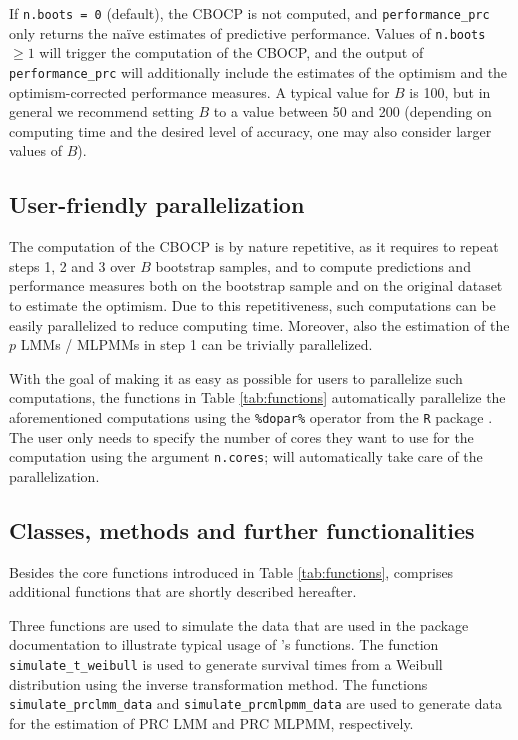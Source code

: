 If \texttt{n.boots\ =\ 0} (default), the CBOCP is not computed, and
\texttt{performance\_prc} only returns the naïve estimates of predictive
performance. Values of \texttt{n.boots} \(\geq 1\) will trigger the
computation of the CBOCP, and the output of \texttt{performance\_prc}
will additionally include the estimates of the optimism and the
optimism-corrected performance measures. A typical value for \(B\) is
100, but in general we recommend setting \(B\) to a value between 50 and
200 (depending on computing time and the desired level of accuracy, one
may also consider larger values of \(B\)).

\subsection{User-friendly
parallelization}\label{user-friendly-parallelization}

The computation of the CBOCP is by nature repetitive, as it requires to
repeat steps 1, 2 and 3 over \(B\) bootstrap samples, and to compute
predictions and performance measures both on the bootstrap sample and on
the original dataset to estimate the optimism. Due to this
repetitiveness, such computations can be easily parallelized to reduce
computing time. Moreover, also the estimation of the \(p\) LMMs / MLPMMs
in step 1 can be trivially parallelized.

With the goal of making it as easy as possible for users to parallelize
such computations, the functions in Table \ref{tab:functions}
automatically parallelize the aforementioned computations using the
\texttt{\%dopar\%} operator from the \texttt{R} package
 \citep{foreach2022}. The user only needs to specify
the number of cores they want to use for the computation using the
argument \texttt{n.cores};  will automatically take care
of the parallelization.

\subsection{Classes, methods and further
functionalities}\label{classes-methods-and-further-functionalities}

Besides the core functions introduced in Table \ref{tab:functions},
 comprises additional functions that are shortly
described hereafter.

Three functions are used to simulate the data that are used in the
package documentation to illustrate typical usage of 's
functions. The function \texttt{simulate\_t\_weibull} is used to
generate survival times from a Weibull distribution using the inverse
transformation method. The functions \texttt{simulate\_prclmm\_data} and
\texttt{simulate\_prcmlpmm\_data} are used to generate data for the
estimation of PRC LMM and PRC MLPMM, respectively.

